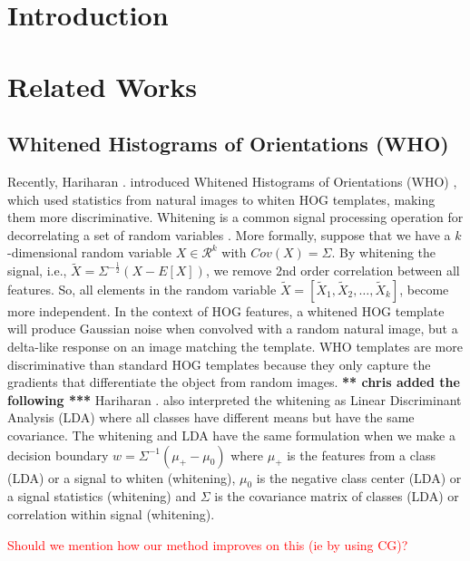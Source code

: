 \documentclass[10pt,twocolumn,letterpaper]{article}
\newcommand{\scream}[1]{{\color{red} \bf *** #1 ***}}
\begin{document}
\section{Introduction}
\label{sec:intro}


\section{Related Works}
\subsection{Whitened Histograms of Orientations (WHO)}
Recently, Hariharan \etal. introduced Whitened Histograms of Orientations (WHO) \cite{Hariharan12}, which used statistics from natural images to whiten HOG templates, making them more discriminative. Whitening is a common signal processing operation for decorrelating a set of random variables \cite{Martinsson05, Belouchrani00}. More formally, suppose that we have a $k$-dimensional random variable $X \in \mathcal{R}^k$ with $Cov(X)=\Sigma$. By whitening the signal, i.e., $\tilde{X}=\Sigma^{-\frac{1}{2}}(X - E[X])$, we remove 2nd order correlation between all features. So, all elements in the random variable $\tilde{X} = \left[\tilde{X}_1, \tilde{X}_2, \dots, \tilde{X}_k\right]$, become more independent. In the context of HOG features, a whitened HOG template will produce Gaussian noise when convolved with a random natural image, but a delta-like response on an image matching the template. WHO templates are more discriminative than standard HOG templates because they only capture the gradients that differentiate the object from random images. \scream{chris added the following} Hariharan \etal. also interpreted the whitening as Linear Discriminant Analysis (LDA) where all classes have different means but have the same covariance. The whitening and LDA have the same formulation when we make a decision boundary $w = \Sigma^{-1}(\mu_+ - \mu_0)$ where $\mu_+$ is the features from a class (LDA) or a signal to whiten (whitening), $\mu_0$ is the negative class center (LDA) or a signal statistics (whitening) and $\Sigma$ is the covariance matrix of classes (LDA) or correlation within signal (whitening).

\textcolor{red}{Should we mention how our method improves on this (ie by using CG)?}
\end{document}
